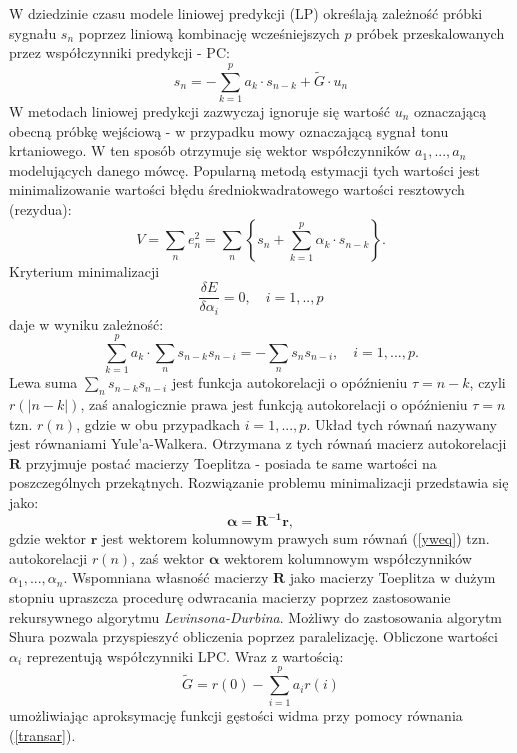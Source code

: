 W dziedzinie czasu modele liniowej predykcji (LP) określają zależność próbki sygnału $s_n$ poprzez liniową kombinację wcześniejszych $p$ próbek przeskalowanych przez współczynniki predykcji - PC:
\begin{equation}
  s_n = - \sum_{k=1}^{p}a_k\cdot s_{n-k}+\tilde{G}\cdot u_n
\end{equation}
W metodach liniowej predykcji zazwyczaj ignoruje się wartość $u_n$ oznaczającą obecną próbkę wejściową - w przypadku mowy oznaczającą sygnał tonu krtaniowego. W ten sposób otrzymuje się wektor współczynników $a_1,...,a_n$ modelujących danego mówcę. Popularną metodą estymacji tych wartości jest minimalizowanie wartości błędu średniokwadratowego wartości resztowych (rezydua):
\begin{equation}
  V = \sum_{n} e_n^2 = \sum_n \left\{ s_n + \sum_{k=1}^p \alpha_k \cdot s_{n-k} \right\}.
\end{equation}
Kryterium minimalizacji
\begin{equation}
  \frac{\delta E}{\delta \alpha_i} = 0, \quad i=1,..,p
\end{equation}
daje w wyniku zależność:
\begin{equation}
  \label{yweq}
  \sum_{k=1}^{p} a_k \cdot \sum_n s_{n-k} s_{n-i} = - \sum_n s_n s_{n-i}, \quad  i=1,...,p.
\end{equation}
Lewa suma $ \sum_n s_{n-k} s_{n-i} $ jest funkcja autokorelacji o opóźnieniu $ \tau = n-k $, czyli $ r(|n-k|) $, zaś analogicznie prawa jest funkcją autokorelacji o opóźnieniu $ \tau = n $ tzn. $ r(n)$, gdzie w obu przypadkach $i=1,...,p$.
Układ tych równań nazywany jest równaniami Yule'a-Walkera. Otrzymana z tych równań macierz autokorelacji $ \bm{R} $ przyjmuje postać macierzy Toeplitza - posiada te same wartości na poszczególnych przekątnych. Rozwiązanie problemu minimalizacji przedstawia się jako:
\begin{equation}
  \bm{\alpha} = \bm{R^{-1}} \bm{r},
\end{equation}
gdzie wektor $ \bm{r}$ jest wektorem kolumnowym prawych sum równań (\ref{yweq}) tzn. autokorelacji $ r(n)$, zaś wektor $ \bm{\alpha} $ wektorem kolumnowym współczynników $\alpha_1,...,\alpha_n$. Wspomniana własność macierzy $\bm{R}$ jako macierzy Toeplitza w dużym stopniu upraszcza procedurę odwracania macierzy poprzez zastosowanie rekursywnego algorytmu \textit{Levinsona-Durbina}. Możliwy do zastosowania algorytm Shura pozwala przyspieszyć obliczenia poprzez paralelizację. Obliczone wartości $\alpha_i$ reprezentują współczynniki LPC. Wraz z wartością:
\begin{equation}
  \tilde{G} = r(0) - \sum_{i=1}^{p} a_i r(i)
\end{equation}
umożliwiając aproksymację funkcji gęstości widma przy pomocy równania (\ref{transar}).

